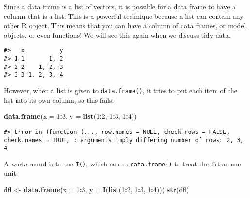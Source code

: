 \documentclass[]{book}
\newenvironment{Shaded}{\begin{snugshade}}{\end{snugshade}}
\newcommand{\KeywordTok}[1]{\textcolor[rgb]{0.13,0.29,0.53}{\textbf{#1}}}
\newcommand{\DataTypeTok}[1]{\textcolor[rgb]{0.13,0.29,0.53}{#1}}
\newcommand{\DecValTok}[1]{\textcolor[rgb]{0.00,0.00,0.81}{#1}}
\newcommand{\StringTok}[1]{\textcolor[rgb]{0.31,0.60,0.02}{#1}}
\newcommand{\OperatorTok}[1]{\textcolor[rgb]{0.81,0.36,0.00}{\textbf{#1}}}
\newcommand{\NormalTok}[1]{#1}
\theoremstyle{definition}
\theoremstyle{definition}
\theoremstyle{definition}
\theoremstyle{remark}
\begin{document}
Since a data frame is a list of vectors, it is possible for a data frame
to have a column that is a list. This is a powerful technique because a
list can contain any other R object. This means that you can have a
column of data frames, or model objects, or even functions! We will see
this again when we discuss tidy data.

\begin{Shaded}
\end{Shaded}

\begin{verbatim}
#>   x          y
#> 1 1       1, 2
#> 2 2    1, 2, 3
#> 3 3 1, 2, 3, 4
\end{verbatim}

However, when a list is given to \texttt{data.frame()}, it tries to put
each item of the list into its own column, so this fails:

\begin{Shaded}
\begin{Highlighting}[]
\KeywordTok{data.frame}\NormalTok{(}\DataTypeTok{x =} \DecValTok{1}\OperatorTok{:}\DecValTok{3}\NormalTok{, }\DataTypeTok{y =} \KeywordTok{list}\NormalTok{(}\DecValTok{1}\OperatorTok{:}\DecValTok{2}\NormalTok{, }\DecValTok{1}\OperatorTok{:}\DecValTok{3}\NormalTok{, }\DecValTok{1}\OperatorTok{:}\DecValTok{4}\NormalTok{))}
\end{Highlighting}
\end{Shaded}

\begin{verbatim}
#> Error in (function (..., row.names = NULL, check.rows = FALSE, check.names = TRUE, : arguments imply differing number of rows: 2, 3, 4
\end{verbatim}

A workaround is to use \texttt{I()}, which causes \texttt{data.frame()}
to treat the list as one unit:

\begin{Shaded}
\begin{Highlighting}[]
\NormalTok{dfl <-}\StringTok{ }\KeywordTok{data.frame}\NormalTok{(}\DataTypeTok{x =} \DecValTok{1}\OperatorTok{:}\DecValTok{3}\NormalTok{, }\DataTypeTok{y =} \KeywordTok{I}\NormalTok{(}\KeywordTok{list}\NormalTok{(}\DecValTok{1}\OperatorTok{:}\DecValTok{2}\NormalTok{, }\DecValTok{1}\OperatorTok{:}\DecValTok{3}\NormalTok{, }\DecValTok{1}\OperatorTok{:}\DecValTok{4}\NormalTok{)))}
\KeywordTok{str}\NormalTok{(dfl)}
\end{Highlighting}
\end{Shaded}
\end{document}
